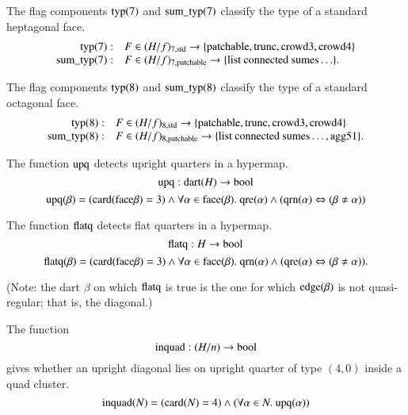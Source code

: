 
\begin{definition}
The flag components ${\operatorname{typ}}(7)$ and ${\operatorname{sum\_typ}}(7)$
classify the type of a standard heptagonal face.
    $$
    \begin{array}{rll}
    {\operatorname{typ}}(7):& F\in (H/f)_{7,{\operatorname{std}}}
    \to
    \{{\operatorname{patchable}},{\operatorname{trunc}},{\operatorname{crowd3}},{\operatorname{crowd4}}\}\\
    {\operatorname{sum\_typ}}(7):& F\in (H/f)_{7,{\operatorname{patchable}}}
    \to
    \{\text{list connected sumes}\ldots\}.
    \end{array}
    $$
\end{definition}

\begin{definition}
The flag components ${\operatorname{typ}}(8)$ and ${\operatorname{sum\_typ}}(8)$
classify the type of a standard octagonal face.
    $$
    \begin{array}{rll}
    {\operatorname{typ}}(8):& F\in (H/f)_{8,{\operatorname{std}}}
    \to
    \{{\operatorname{patchable}},{\operatorname{trunc}},{\operatorname{crowd3}},{\operatorname{crowd4}}\}\\
    {\operatorname{sum\_typ}}(8):& F\in (H/f)_{8,{\operatorname{patchable}}}
    \to
    \{\text{list connected sumes}\ldots,{\operatorname{agg51}}\}.
    \end{array}
    $$
\end{definition}


\begin{definition} The function ${\operatorname{upq}}$ detects upright
quarters in a hypermap.
    $${\operatorname{upq}}:{\operatorname{dart}}(H) \to \operatorname{bool}$$
    $${\operatorname{upq}}(\beta) =  ({\operatorname{card}}({\operatorname{face}}\beta)=3)\wedge
      \forall\alpha\in {\operatorname{face}}(\beta).\
         {\operatorname{qre}}(\alpha)\wedge
         ({\operatorname{qrn}}(\alpha)\Leftrightarrow
         (\beta\ne\alpha))$$
\end{definition}

\begin{definition}
The function ${\operatorname{flatq}}$ detects flat quarters in a hypermap.
     $${\operatorname{flatq}}:H \to \operatorname{bool}$$
    $${\operatorname{flatq}}(\beta) = ({\operatorname{card}}({\operatorname{face}}\beta)=3)\wedge
       \forall\alpha\in {\operatorname{face}}(\beta).\
         {\operatorname{qrn}}(\alpha)\wedge
         ({\operatorname{qre}}(\alpha) \Leftrightarrow
         (\beta\ne\alpha)).$$
\end{definition}
(Note: the dart $\beta$ on which ${\operatorname{flatq}}$ is true is the one
for which ${\operatorname{edge}}(\beta)$ is not quasi-regular; that is, the
diagonal.)


\begin{definition}
The function
    $${\operatorname{inquad}}:(H/n)\to \operatorname{bool}$$
gives whether an upright diagonal lies on upright quarter of type
$(4,0)$ inside a quad cluster.
    $${\operatorname{inquad}}(N) =
    ({\operatorname{card}}(N)=4) \wedge (\forall \alpha\in N.\
        {\operatorname{upq}}(\alpha))
    $$
\end{definition}

